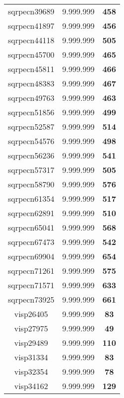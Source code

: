\begin{tabular}{cc||c}
sqrpecn39689     & 9.999.999        & {\bf 458}       \\ 
sqrpecn41897     & 9.999.999        & {\bf 456}       \\ 
sqrpecn44118     & 9.999.999        & {\bf 505}       \\ 
sqrpecn45700     & 9.999.999        & {\bf 465}       \\ 
sqrpecn45811     & 9.999.999        & {\bf 466}       \\ 
sqrpecn48383     & 9.999.999        & {\bf 467}       \\ 
sqrpecn49763     & 9.999.999        & {\bf 463}       \\ 
sqrpecn51856     & 9.999.999        & {\bf 499}       \\ 
sqrpecn52587     & 9.999.999        & {\bf 514}       \\ 
sqrpecn54576     & 9.999.999        & {\bf 498}       \\ 
sqrpecn56236     & 9.999.999        & {\bf 541}       \\ 
sqrpecn57317     & 9.999.999        & {\bf 505}       \\ 
sqrpecn58790     & 9.999.999        & {\bf 576}       \\ 
sqrpecn61354     & 9.999.999        & {\bf 517}       \\ 
sqrpecn62891     & 9.999.999        & {\bf 510}       \\ 
sqrpecn65041     & 9.999.999        & {\bf 568}       \\ 
sqrpecn67473     & 9.999.999        & {\bf 542}       \\ 
sqrpecn69904     & 9.999.999        & {\bf 654}       \\ 
sqrpecn71261     & 9.999.999        & {\bf 575}       \\ 
sqrpecn71571     & 9.999.999        & {\bf 633}       \\ 
sqrpecn73925     & 9.999.999        & {\bf 661}       \\ 
visp26405        & 9.999.999        & {\bf 83}        \\ 
visp27975        & 9.999.999        & {\bf 49}        \\ 
visp29489        & 9.999.999        & {\bf 110}       \\ 
visp31334        & 9.999.999        & {\bf 83}        \\ 
visp32354        & 9.999.999        & {\bf 78}        \\ 
visp34162        & 9.999.999        & {\bf 129}       \\ 

\end{tabular}

